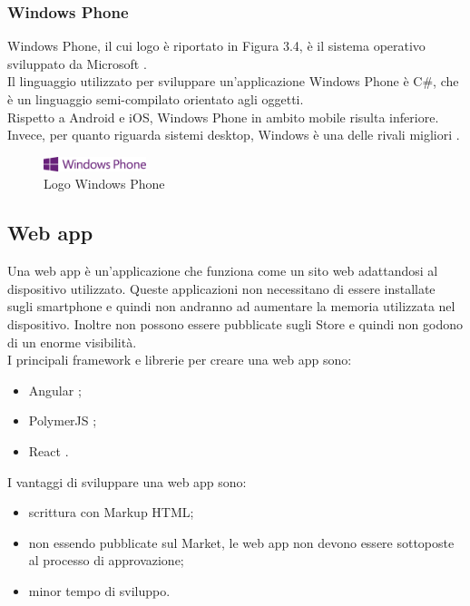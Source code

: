  \subsubsection{Windows Phone}
Windows Phone, il cui logo è riportato in Figura 3.4, è il sistema operativo sviluppato da Microsoft \cite{microsoft}.\\
Il linguaggio utilizzato per sviluppare un'applicazione Windows Phone è C\#, che è un linguaggio semi-compilato orientato agli oggetti.\\
Rispetto a Android e iOS, Windows Phone in ambito mobile risulta inferiore. Invece, per quanto riguarda sistemi desktop, Windows è una delle rivali migliori \cite{sviluppo}.\\
 \begin{figure}[htbp]	
	\centering
	\includegraphics[width=3cm]{immagini/logowindowsphone.png}
	\caption{Logo Windows Phone}
	\label{fig:Logo Windows Phone}
\end{figure}
 
\subsection{Web app}
Una web app \cite{differenza,apptonative} è un'applicazione che funziona come un sito web adattandosi al dispositivo utilizzato.
Queste applicazioni non necessitano di essere installate sugli smartphone e quindi non andranno ad aumentare la memoria utilizzata nel dispositivo.
 Inoltre non possono essere pubblicate sugli Store e quindi non godono di un enorme visibilità.\\
I principali framework e librerie per creare una web app sono:
\begin{itemize}
	\item Angular \cite{angular}; 
	\item PolymerJS \cite{polymer}; 
	\item React \cite{react}.
\end{itemize}
I vantaggi di sviluppare una web app sono:
\begin{itemize}
	\item scrittura con Markup HTML;
	\item non essendo pubblicate sul Market, le web app non devono essere sottoposte al processo di approvazione; 
	\item minor tempo di sviluppo.
\end{itemize}

